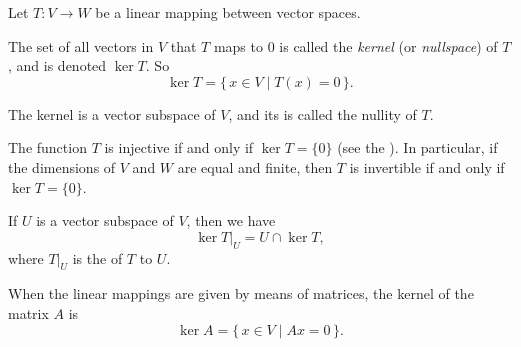 \documentclass{article}
\begin{document}

Let $T\colon V\to W$ be a linear mapping between vector spaces.

The set of all vectors in $V$ that $T$ maps to $0$
is called the \emph{kernel} (or \emph{nullspace}) of $T$,
and is denoted $\ker T$. So
\[
  \ker T = \{\, x \in V\mid T(x)=0\,\}.
\]

The kernel is a vector subspace of $V$,
and its  is called the nullity of $T$.

The function $T$ is injective if and only if $\ker T=\{0\}$
(see the ).
In particular, if the dimensions of $V$ and $W$ are equal and finite,
then $T$ is invertible if and only if $\ker T=\{0\}$.

If $U$ is a vector subspace of $V$, then we have
\[
  \ker T|_U = U \cap \ker T,
\]
where $T|_U$ is
the  of $T$ to $U$.

When the linear mappings are given by means of matrices,
the kernel of the matrix $A$ is
\[
  \ker A=\{\,x\in V \mid Ax=0\,\}.
\]
\end{document}
